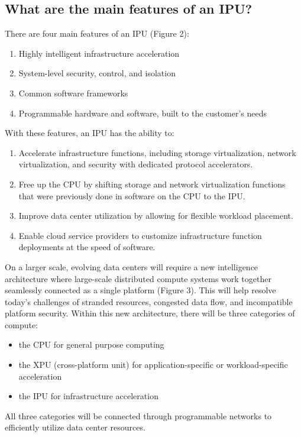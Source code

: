 \documentclass[../sn.tex]{subfiles}
\begin{document}
\subsection{What are the main features of an IPU?}
There are four main features of an IPU (Figure 2): 
\begin{enumerate}
    \item Highly intelligent infrastructure acceleration 
    \item System-level security, control, and isolation
    \item Common software frameworks 
    \item Programmable hardware and software, built to the customer's needs
\end{enumerate} With these features, an IPU has the ability to:
\begin{enumerate}
    \item Accelerate infrastructure functions, including storage virtualization, network virtualization, and security with dedicated protocol accelerators.
    \item Free up the CPU by shifting storage and network virtualization functions that were previously done in software on the CPU to the IPU. 
    \item Improve data center utilization by allowing for flexible workload placement.
    \item Enable cloud service providers to customize infrastructure function deployments at the speed of software. 
\end{enumerate} 
On a larger scale, evolving data centers will require a new intelligence architecture where large-scale distributed compute systems work together seamlessly connected as a single platform (Figure 3).
This will help resolve today's challenges of stranded resources, congested data flow, and incompatible platform security.
Within this new architecture, there will be three categories of compute:
\begin{itemize}
    \item the CPU for general purpose computing
    \item the XPU (cross-platform unit) for application-specific or workload-specific acceleration
    \item the IPU for infrastructure acceleration
\end{itemize}
All three categories will be connected through programmable networks to efficiently utilize data center resources.
\end{document}
